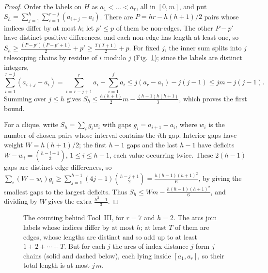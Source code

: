 \documentclass[11pt]{amsart}
\theoremstyle{tplain}
\theoremstyle{tdefinition}
\theoremstyle{tremark}
\begin{document}
\begin{proof}
Order the labels on $H$ as $a_1<\dots<a_r$, all in $[0,m]$, and put
$S_h=\sum_{j=1}^h\sum_{i=1}^{r-j}(a_{i+j}-a_i)$. There are
$P=hr-h(h+1)/2$ pairs whose indices differ by at most $h$; let $p'\le p$ of
them be non-edges. The other $P-p'$ have distinct positive differences, and
each non-edge has length at least one, so
$S_h\ge\frac{(P-p')(P-p'+1)}2+p'\ge\frac{T(T+1)}2+p$. For fixed $j$, the
inner sum splits into $j$ telescoping chains by residue of $i$ modulo $j$
(Fig.~\ref{fig:core}); since the labels are distinct integers,
\[
 \sum_{i=1}^{r-j}(a_{i+j}-a_i)=\sum_{i=r-j+1}^ra_i-\sum_{i=1}^ja_i
 \le j(a_r-a_1)-j(j-1)\le jm-j(j-1).
\]
Summing over $j\le h$ gives $S_h\le\frac{h(h+1)}2m-\frac{(h-1)h(h+1)}3$, which
proves the first bound.

For a clique, write $S_h=\sum_ig_iw_i$ with gaps $g_i=a_{i+1}-a_i$, where
$w_i$ is the number of chosen pairs whose interval contains the $i$th gap. Interior
gaps have weight $W=h(h+1)/2$; the first $h-1$ gaps and the last $h-1$ have
deficits $W-w_i=\binom{h-i+1}2$, $1\le i\le h-1$, each value occurring twice.
These $2(h-1)$ gaps are distinct edge differences, so
$\sum_i(W-w_i)g_i\ge\sum_{j=1}^{h-1}(4j-1)\binom{h-j+1}2=\frac{h(h-1)(h+1)^2}6$,
by giving the smallest gaps to the largest deficits. Thus
$S_h\le Wm-\frac{h(h-1)(h+1)^2}6$, and dividing by $W$ gives the extra
$\frac{h^2-1}3$.
\end{proof}

\begin{figure}[ht]
\centering
{}
\caption{The counting behind Tool~III, for $r=7$ and $h=2$. The arcs join
labels whose indices differ by at most $h$; at least $T$ of them are edges, whose lengths are distinct and so add up
to at least $1+2+\cdots+T$. But for each $j$ the
arcs of index distance $j$ form $j$ chains (solid and dashed below), each
lying inside $[a_1,a_r]$, so their total length is at most $j\,m$.}
\label{fig:core}
\end{figure}
\end{document}
